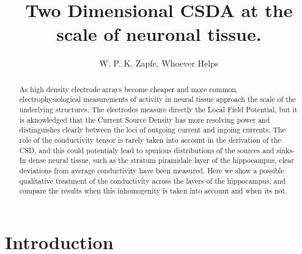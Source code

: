 \documentclass{article}
\title{Two Dimensional CSDA at the scale of neuronal tissue.}
\author{W. P. K. Zapfe, Whoever Helps}
\begin{document}
\maketitle

\begin{abstract}
As high density electrode arrays become cheaper and more common, 
electrophysiological measurements of activity in neural tissue approach
the scale of the underlying structures. The electrodes measure
directly the Local Field Potential, but it is aknowledged that the
Current Source Density has more resolving power and distinguishes
clearly between the loci of outgoing current and ingoing currents.
 The role of the conductivity tensor is rarely taken into account
in the derivation of the CSD, and this could potentialy lead to
spurious distributions of the sources and sinks- 
In dense neural tissue, such as the
stratum piramidale layer of the hippocampus, clear
deviations from average conductivity have been measured. 
Here we show a possible qualitative treatment of the conductivity
across the layers of the hippocampus, and compare the results
when this inhomogenity is taken into account and when its not.
\end{abstract}


\section{Introduction}
\end{document}
